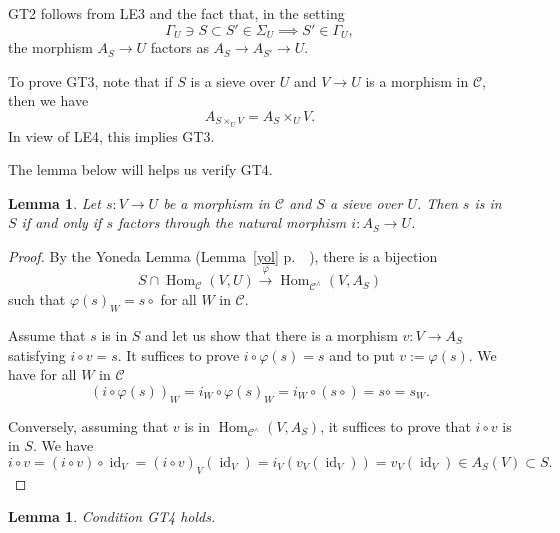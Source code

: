 \documentclass[12pt]{article}
\newtheorem{lem}[thm]{Lemma}
\theoremstyle{remark}
\theoremstyle{definition}
\newcommand{\C}{\mathcal C}
\newcommand{\pp}{\varphi}
\newcommand{\xr}{\xrightarrow}
\DeclareMathOperator{\id}{id}
\DeclareMathOperator{\Hom}{Hom}
\begin{document}
GT2 follows from LE3 and the fact that, in the setting 
$$
\Gamma_U\ni S\subset S'\in\Sigma_U\implies S'\in\Gamma_U,
$$ 
the morphism $A_S\to U$ factors as $A_S\to A_{S'}\to U$. 

To prove GT3, note that if $S$ is a sieve over $U$ and $V\to U$ is a morphism in $\C$, then we have 
%
\begin{equation}\label{asuv}
A_{S\times_UV}=A_S\times_UV.
\end{equation}
%
In view of LE4, this implies GT3.  

The lemma below will helps us verify GT4. 

\begin{lem}\label{prepagt4}
Let $s:V\to U$ be a morphism in $\C$ and $S$ a sieve over $U$. Then $s$ is in $S$ if and only if $s$ factors through the natural morphism $i:A_S\to U$.
\end{lem}

\begin{proof}
By the Yoneda Lemma (Lemma~\ref{yol} p.~~\pageref{yol}), there is a bijection 
$$
S\cap\Hom_\C(V,U)\xr\pp\Hom_{\C^\wedge}(V,A_S)
$$
such that $\pp(s)_W=s\circ$ for all $W$ in $\C$. 

Assume that $s$ is in $S$ and let us show that there is a morphism $v:V\to A_S$ satisfying $i\circ v=s$. It suffices to prove $i\circ\pp(s)=s$ and to put $v:=\pp(s)$. We have for all $W$ in $\C$
$$
(i\circ\pp(s))_W=i_W\circ\pp(s)_W=i_W\circ(s\circ)=s\circ=s_W.
$$ 

Conversely, assuming that $v$ is in $\Hom_{\C^\wedge}(V,A_S)$, it suffices to prove that $i\circ v$ is in $S$. We have 
$$
i\circ v=(i\circ v)\circ\id_V=(i\circ v)_V(\id_V)=i_V(v_V(\id_V))=v_V(\id_V)\in A_S(V)\subset S. 
$$ 
\end{proof} 

\begin{lem}
Condition GT4 holds.
\end{lem}
\end{document}
